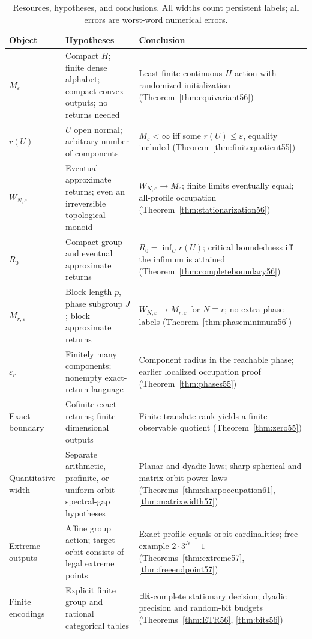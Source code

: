 \clearpage
\begin{table}[p]
\centering\small
\caption{Resources, hypotheses, and conclusions. All widths count persistent labels; all errors are worst-word numerical errors.}\label{tab:map56}
\begin{tabular}{p{}p{}p{}}
\toprule
Object & Hypotheses & Conclusion\\
\midrule
$M_\varepsilon$ & Compact $H$; finite dense alphabet; compact convex outputs; no returns needed & Least finite continuous $H$-action with randomized initialization (Theorem~\ref{thm:equivariant56})\\[3pt]
$r(U)$ & $U$ open normal; arbitrary number of components & $M_\varepsilon<\infty$ iff some $r(U)\le\varepsilon$, equality included (Theorem~\ref{thm:finitequotient55})\\[3pt]
$W_{N,\varepsilon}$ & Eventual approximate returns; even an irreversible topological monoid & $W_{N,\varepsilon}\to M_\varepsilon$; finite limits eventually equal; all-profile occupation (Theorem~\ref{thm:stationarization56})\\[3pt]
$R_0$ & Compact group and eventual approximate returns & $R_0=\inf_Ur(U)$; critical boundedness iff the infimum is attained (Theorem~\ref{thm:completeboundary56})\\[3pt]
$M_{r,\varepsilon}$ & Block length $p$, phase subgroup $J$; block approximate returns & $W_{N,\varepsilon}\to M_{r,\varepsilon}$ for $N\equiv r$; no extra phase labels (Theorem~\ref{thm:phaseminimum56})\\[3pt]
$\varepsilon_r$ & Finitely many components; nonempty exact-return language & Component radius in the reachable phase; earlier localized occupation proof (Theorem~\ref{thm:phases55})\\[3pt]
Exact boundary & Cofinite exact returns; finite-dimensional outputs & Finite translate rank yields a finite observable quotient (Theorem~\ref{thm:zero55})\\[3pt]
Quantitative width & Separate arithmetic, profinite, or uniform-orbit spectral-gap hypotheses & Planar and dyadic laws; sharp spherical and matrix-orbit power laws (Theorems~\ref{thm:sharpoccupation61}, \ref{thm:matrixwidth57})\\[3pt]
Extreme outputs & Affine group action; target orbit consists of legal extreme points & Exact profile equals orbit cardinalities; free example $2\cdot3^N-1$ (Theorems~\ref{thm:extreme57}, \ref{thm:freeendpoint57})\\[3pt]
Finite encodings & Explicit finite group and rational categorical tables & $\exists\mathbb R$-complete stationary decision; dyadic precision and random-bit budgets (Theorems~\ref{thm:ETR56}, \ref{thm:bits56})\\
\bottomrule
\end{tabular}
\end{table}
\clearpage

